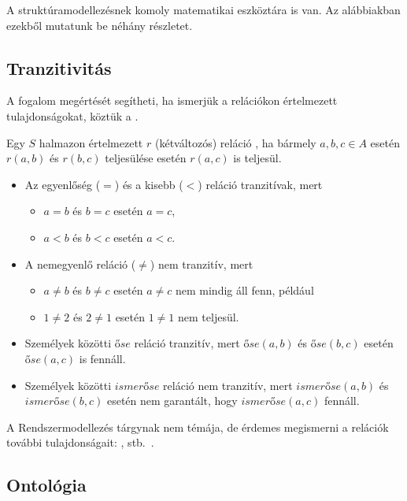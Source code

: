 A struktúramodellezésnek komoly matematikai eszköztára is van. Az alábbiakban ezekből mutatunk be néhány részletet.

\subsection{Tranzitivitás}

A  fogalom megértését segítheti, ha ismerjük a relációkon értelmezett tulajdonságokat, köztük a .

Egy $S$ halmazon értelmezett $r$ (kétváltozós) reláció , ha bármely $a,b,c \in A$ esetén $r(a, b)$ és $r(b, c)$ teljesülése esetén $r(a, c)$ is teljesül.

\begin{itemize}
	\item Az egyenlőség ($=$) és a kisebb ($<$) reláció tranzitívak, mert
	\begin{itemize}
		\item $a = b$ és $b = c$ esetén $a = c$,
		\item $a < b$ és $b < c$ esetén $a < c$.
	\end{itemize}
	\item A nemegyenlő reláció ($\neq$) nem tranzitív, mert 
	\begin{itemize}
		\item $a \neq b$ és $b \neq c$ esetén $a \neq c$ nem mindig áll fenn, például
		\item $1 \neq 2$ és $2 \neq 1$ esetén $1 \neq 1$ nem teljesül.
	\end{itemize}
	\item Személyek közötti $\mathit{őse}$ reláció tranzitív, mert $\mathit{őse}(a, b)$ és $\mathit{őse}(b, c)$ esetén $\mathit{őse}(a, c)$ is fennáll. 
	\item Személyek közötti $\mathit{ismerőse}$ reláció nem tranzitív, mert $\mathit{ismerőse}(a, b)$ és $\mathit{ismerőse}(b, c)$ esetén nem garantált, hogy $\mathit{ismerőse}(a, c)$ fennáll.
\end{itemize}


A Rendszermodellezés tárgynak nem témája, de érdemes megismerni a relációk további tulajdonságait: ,  stb.~\cite{relaciok}. 

\subsection{Ontológia}

